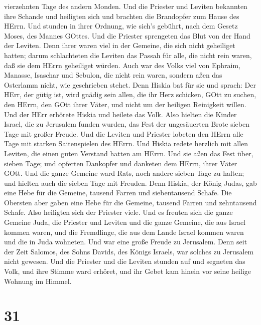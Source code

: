 vierzehnten Tage des andern Monden. Und die Priester und Leviten
bekannten ihre Schande und heiligten sich und brachten die Brandopfer
zum Hause des HErrn.  Und stunden in ihrer Ordnung, wie
sich's gebührt, nach dem Gesetz Moses, des Mannes GOttes. Und die
Priester sprengeten das Blut von der Hand der Leviten. 
Denn ihrer waren viel in der Gemeine, die sich nicht geheiliget hatten;
darum schlachteten die Leviten das Passah für alle, die nicht rein
waren, daß sie dem HErrn geheiliget würden.  Auch war des
Volks viel von Ephraim, Manasse, Isaschar und Sebulon, die nicht rein
waren, sondern aßen das Osterlamm nicht, wie geschrieben stehet. Denn
Hiskia bat für sie und sprach: Der HErr, der gütig ist, wird gnädig sein
 allen, die ihr Herz schicken, GOtt zu suchen, den HErrn,
den GOtt ihrer Väter, und nicht um der heiligen Reinigkeit willen.
 Und der HErr erhörete Hiskia und heilete das Volk.
 Also hielten die Kinder Israel, die zu Jerusalem funden
wurden, das Fest der ungesäuerten Brote sieben Tage mit großer Freude.
Und die Leviten und Priester lobeten den HErrn alle Tage mit starken
Saitenspielen des HErrn.  Und Hiskia redete herzlich mit
allen Leviten, die einen guten Verstand hatten am HErrn. Und sie aßen
das Fest über, sieben Tage; und opferten Dankopfer und danketen dem
HErrn, ihrer Väter GOtt.  Und die ganze Gemeine ward Rats,
noch andere sieben Tage zu halten; und hielten auch die sieben Tage mit
Freuden.  Denn Hiskia, der König Judas, gab eine Hebe für
die Gemeine, tausend Farren und siebentausend Schafe. Die Obersten aber
gaben eine Hebe für die Gemeine, tausend Farren und zehntausend Schafe.
Also heiligten sich der Priester viele.  Und es freuten
sich die ganze Gemeine Juda, die Priester und Leviten und die ganze
Gemeine, die aus Israel kommen waren, und die Fremdlinge, die aus dem
Lande Israel kommen waren und die in Juda wohneten.  Und
war eine große Freude zu Jerusalem. Denn seit der Zeit Salomos, des
Sohns Davids, des Königs Israels, war solches zu Jerusalem nicht
gewesen.  Und die Priester und die Leviten stunden auf und
segneten das Volk, und ihre Stimme ward erhöret, und ihr Gebet kam
hinein vor seine heilige Wohnung im Himmel.

\hypertarget{section-30}{%
\section{31}\label{section-30}}

